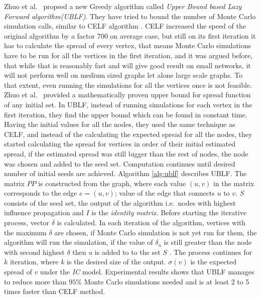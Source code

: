 \documentclass[english]{tktltiki}
\begin{document}
Zhuo et al.\ \cite{zhuo13} propsed a new Greedy algorithm called \textit{Upper Bound based Lazy Forward algorithm(UBLF)}. They have tried to bound the number of Monte Carlo simulation calls, similar to CELF algorithm \cite{leskovec07}. CELF increased the speed of the original algorithm by a factor 700 on average case, but still on its first iteration it has to calculate the spread of every vertex, that means Monte Carlo simulations have to be run for all the vertices in the first iteration, and it was argued before, that while that is reasonably fast and will give good result on small networks, it will not perform well on medium sized graphs let alone large scale graphs. To that extent, even running the simulations for all the vertices once is not feasible. Zhuo et al.\ \cite{zhuo13} provided a mathematically proven upper bound for spread function of any initial set. In UBLF, instead of running simulations for each vertex in the first iteration, they find the upper bound which can be found in constant time. Having the initial values for all the nodes, they used the same technique as CELF, and instead of the calculating the expected spread for all the nodes, they started calculating the spread for vertices in order of their initial estimated spread, if the estimated spread was still bigger than the rest of nodes, the node was chosen and added to the seed set. Computation continues until desired number of initial seeds are achieved. Algorithm \ref{alg:ublf} describes UBLF. The matrix $PP$ is constructed from the graph, where each value $(u,v)$ in the matrix corresponds to the edge $e=(u,v)$; value of the edge that connects $u$ to $v$. $S$ consists of the seed set, the output of the algorithm i.e.\ nodes with highest influence propagation and $I$ is the \textit{identity matrix}. Before starting the iterative process, vector $\delta$ is calculated. In each iteration of the algorithm, vertices with the maximum $\delta$ are chosen, if Monte Carlo simulation is not yet run for them, the algorithm will run the simulation, if the value of $\delta_u$ is still greater than the node with second highest $\delta$ then $u$ is added to to the set $S$ . The process continues for $k$ iteration, where $k$ is the desired size of the output. $\sigma(v)$ is the expected spread of $v$ under the \textit{IC} model. Experimental results shows that UBLF manages to reduce more than $95\%$ Monte Carlo simulations needed and is at least 2 to 5 times faster than CELF method.
\end{document}
